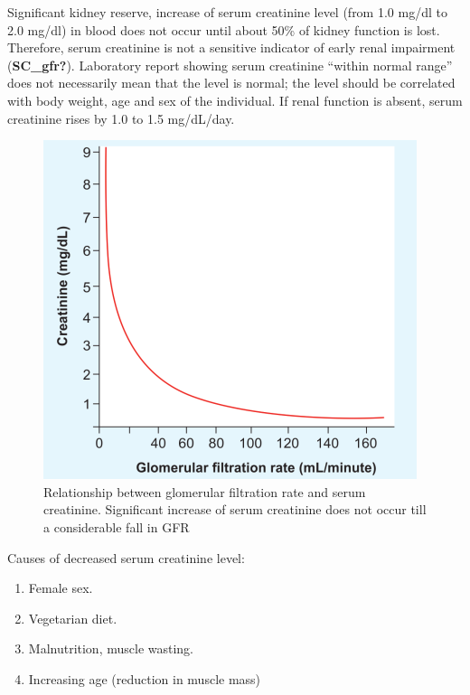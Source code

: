 \documentclass[
  letterpaper,
  DIV=11,
  numbers=noendperiod]{scrreprt}
\begin{document}
Significant kidney reserve, increase of serum creatinine level (from 1.0
mg/dl to 2.0 mg/dl) in blood does not occur until about 50\% of kidney
function is lost. Therefore, serum creatinine is not a sensitive
indicator of early renal impairment (\textbf{SC\_gfr?}). Laboratory
report showing serum creatinine ``within normal range'' does not
necessarily mean that the level is normal; the level should be
correlated with body weight, age and sex of the individual. If renal
function is absent, serum creatinine rises by 1.0 to 1.5 mg/dL/day.

\begin{figure}

{\centering \includegraphics{image/SC-GFR.png}

}

\caption{Relationship between glomerular filtration rate and serum
creatinine. Significant increase of serum creatinine does not occur till
a considerable fall in GFR}

\end{figure}%

Causes of decreased serum creatinine level:

\begin{enumerate}
\def\labelenumi{\arabic{enumi}.}
\item
  Female sex.
\item
  Vegetarian diet.
\item
  Malnutrition, muscle wasting.
\item
  Increasing age (reduction in muscle mass)
\end{enumerate}
\end{document}
